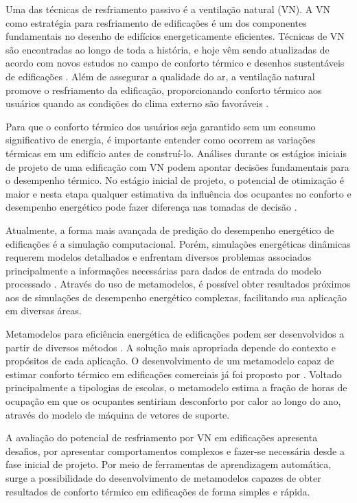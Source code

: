 \documentclass[brazil,hardcopy,openany,a5paper]{ufscthesis}
\begin{document}
	Uma das técnicas de resfriamento passivo é a ventilação natural (VN). A VN como estratégia para resfriamento de edificações é um dos componentes fundamentais no desenho de edifícios energeticamente eficientes. Técnicas de VN são encontradas ao longo de toda a história, e hoje vêm sendo atualizadas de acordo com novos estudos no campo de conforto térmico e desenhos sustentáveis de edificações \cite{Pesic2018}. Além de assegurar a qualidade do ar, a ventilação natural promove o resfriamento da edificação, proporcionando conforto térmico aos usuários quando as condições do clima externo são favoráveis \cite{Yao2009}.
	
	Para que o conforto térmico dos usuários seja garantido sem um consumo significativo de energia, é importante entender como ocorrem as variações térmicas em um edifício antes de construí-lo. Análises durante os estágios iniciais de projeto de uma edificação com VN podem apontar decisões fundamentais para o desempenho térmico. No estágio inicial de projeto, o potencial de otimização é maior e nesta etapa qualquer estimativa da influência dos ocupantes no conforto e desempenho energético pode fazer diferença nas tomadas de decisão \cite{Belleri2014}.
	
	Atualmente, a forma mais avançada de predição do desempenho energético de edificações é a simulação computacional. Porém, simulações energéticas dinâmicas requerem modelos detalhados e enfrentam diversos problemas associados principalmente a informações necessárias para dados de entrada do modelo processado \cite{Corgnati2013}. Através do uso de metamodelos, é possível obter resultados próximos aos de simulações de desempenho energético complexas, facilitando sua aplicação em diversas áreas.
	
	Metamodelos para eficiência energética de edificações podem ser desenvolvidos a partir de diversos métodos \cite{Ostergard2018}. A solução mais apropriada depende do contexto e propósitos de cada aplicação. O desenvolvimento de um metamodelo capaz de estimar conforto térmico em edificações comerciais já foi proposto por  \cite{Rackes2016}. Voltado principalmente a tipologias de escolas, o metamodelo estima a fração de horas de ocupação em que os ocupantes sentiriam desconforto por calor ao longo do ano, através do modelo de máquina de vetores de suporte.
	\cite{CarrilhodaGraca2016}
	
	A avaliação do potencial de resfriamento por VN em edificações apresenta desafios, por apresentar comportamentos complexos e fazer-se necessária desde a fase inicial de projeto. Por meio de ferramentas de aprendizagem automática, surge a possibilidade do desenvolvimento de metamodelos capazes de obter resultados de conforto térmico em edificações de forma simples e rápida. 
	
\end{document}
